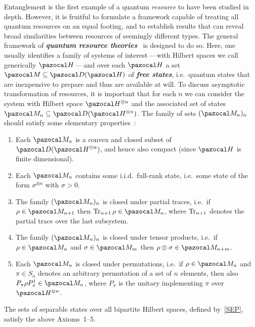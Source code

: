\documentclass[11pt,notitlepage,tightenlines,nofootinbib,superscriptaddress]{revtex4-1}
\newcommand{\deff}[1]{\textbf{\emph{#1}}}
\begin{document}
Entanglement is the first example of a quantum \emph{resource} to have been studied in depth. However, it is fruitful to formulate a framework capable of treating all quantum resources on an equal footing, and to establish results that can reveal broad similarities between resources of seemingly different types. The general framework of \deff{quantum resource theories}~\cite{RT-review} is designed to do so. Here, one usually identifies a family of systems of interest\,---\,with Hilbert spaces we call generically $\HH$\,---\,and over each $\HH$ a set $\MM\subseteq \D(\HH)$ of \deff{free states}, i.e.\ quantum states that are inexpensive to prepare and thus are available at will. To discuss asymptotic transformation of resources, it is important that for each $n$ we can consider the system with Hilbert space $\HH^{\otimes n}$ and the associated set of states $\MM_n\subseteq \D(\HH^{\otimes n})$. The family of sets $(\MM_n)_n$ should satisfy some elementary properties~\cite[p.~795]{Brandao2010}:
\begin{enumerate}
    \item Each $\MM_n$ is a convex and closed subset of $\D(\HH^{\otimes n})$, and hence also compact (since $\HH$ is finite dimensional).
    \item Each $\MM_n$ contains some i.i.d.\ full-rank state, i.e.\ some state of the form $\sigma^{\otimes n}$ with $\sigma>0$.
    \item The family $(\MM_{n})_n$ is closed under partial traces, i.e.\ if $\rho\in \MM_{n+1}$ then $\Tr_{n+1}\rho\in \MM_n$, where $\operatorname{Tr}_{n+1}$ denotes the partial trace over the last subsystem.
    \item The family $(\MM_{n})_n$ is closed under tensor products, i.e.\ if $\rho\in \MM_n$ and $\sigma\in \MM_m$ then $\rho\otimes \sigma\in \MM_{n+m}$.
    \item Each $\MM_n$ is closed under permutations, i.e.\ if $\rho\in \MM_n$ and $\pi\in S_n$ denotes an arbitrary permutation of a set of $n$ elements, then also $P_\pi\rho P_\pi^\dag\in \MM_n$, where $P_\pi$ is the unitary implementing $\pi$ over $\HH^{\otimes n}$. 
\end{enumerate}

\begin{rem}
The sets of separable states over all bipartite Hilbert spaces, defined by~\eqref{SEP}, satisfy the above Axioms~1--5.
\end{rem}
\end{document}
